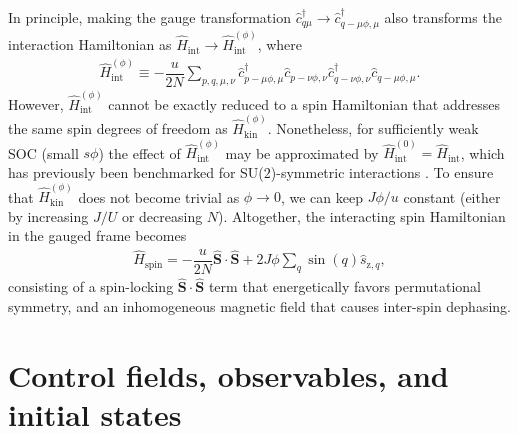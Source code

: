 \documentclass[aps,pra,nofootinbib,twocolumn,superscriptaddress]{revtex4-2}
\renewcommand{\t}{\text} %
\newcommand{\f}[2]{\dfrac{#1}{#2}} %
\newcommand{\p}[1]{\left(#1\right)} %
\renewcommand{\v}{\bm} %
\newcommand{\1}{\mathds{1}}
\renewcommand{\c}{\hat c}
\newcommand{\s}{\hat s}
\renewcommand{\H}{\hat H}
\renewcommand{\S}{\hat S}
\newcommand{\z}{\text{z}}
\newcommand{\spin}{\text{spin}}
\begin{document}
In principle, making the gauge transformation $\c_{q\mu}^\dag\to \c_{q-\mu\phi,\mu}^\dag$ also transforms the interaction Hamiltonian as $\H_{\t{int}} \to \H_{\t{int}}^{(\phi)}$, where
\begin{align}
  \H_{\t{int}}^{(\phi)}
  \equiv -\f{u}{2N} \sum_{p,q,\mu,\nu}
  \c_{p-\mu\phi,\mu}^\dag \c_{p-\nu\phi,\nu}
  \c_{q-\nu\phi,\nu}^\dag \c_{q-\mu\phi,\mu}.
\end{align}
However, $\H_{\t{int}}^{(\phi)}$ cannot be exactly reduced to a spin Hamiltonian that addresses the same spin degrees of freedom as $\H_{\t{kin}}^{(\phi)}$.
Nonetheless, for sufficiently weak SOC (small $s\phi$) the effect of $\H_{\t{int}}^{(\phi)}$ may be approximated by $\H_{\t{int}}^{(0)}=\H_{\t{int}}$, which has previously been benchmarked for SU($2$)-symmetric interactions \cite{he2019engineering, smale2019observation}.
To ensure that $\H_{\t{kin}}^{(\phi)}$ does not become trivial as $\phi\to0$, we can keep $J\phi/u$ constant (either by increasing $J/U$ or decreasing $N$).
Altogether, the interacting spin Hamiltonian in the gauged frame becomes
\begin{align}
  \H_\spin = -\f{u}{2N} \v\S\cdot\v\S + 2J\phi \sum_q \sin\p{q} \s_{\z,q},
  \label{eq:H_spin}
\end{align}
consisting of a spin-locking $\v\S\cdot\v\S$ term that energetically favors permutational symmetry, and an inhomogeneous magnetic field that causes inter-spin dephasing.

\section{Control fields, observables, and initial states}
\label{sec:controls}
\end{document}
